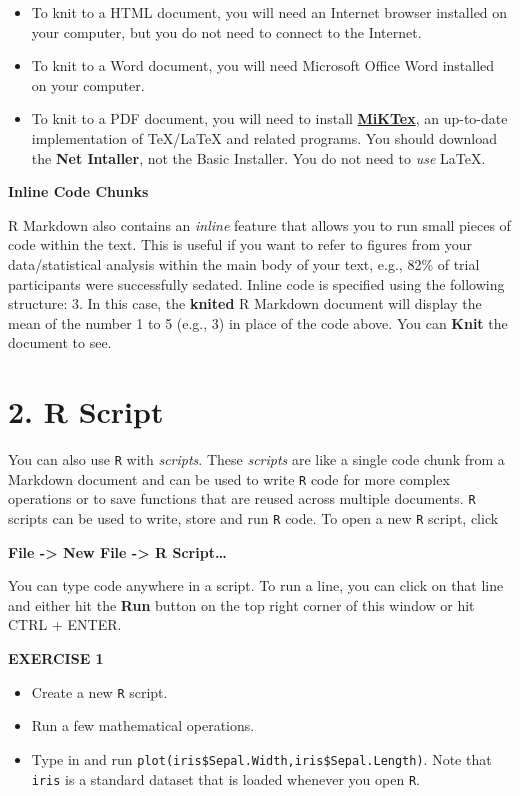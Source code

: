 \documentclass[
]{article}
\begin{document}
\begin{itemize}
\item
  To knit to a HTML document, you will need an Internet browser
  installed on your computer, but you do not need to connect to the
  Internet.
\item
  To knit to a Word document, you will need Microsoft Office Word
  installed on your computer.
\item
  To knit to a PDF document, you will need to install
  \href{https://miktex.org/download}{\textbf{MiKTex}}, an up-to-date
  implementation of TeX/LaTeX and related programs. You should download
  the \textbf{Net Intaller}, not the Basic Installer. You do not need to
  \emph{use} LaTeX.
\end{itemize}

\textbf{Inline Code Chunks}

R Markdown also contains an \emph{inline} feature that allows you to run
small pieces of code within the text. This is useful if you want to
refer to figures from your data/statistical analysis within the main
body of your text, e.g., 82\% of trial participants were successfully
sedated. Inline code is specified using the following structure: 3. In
this case, the \textbf{knited} R Markdown document will display the mean
of the number 1 to 5 (e.g., 3) in place of the code above. You can
\textbf{Knit} the document to see.

\hypertarget{r-script}{%
\section{2. R Script}\label{r-script}}

You can also use \texttt{R} with \emph{scripts}. These \emph{scripts}
are like a single code chunk from a Markdown document and can be used to
write \texttt{R} code for more complex operations or to save functions
that are reused across multiple documents. \texttt{R} scripts can be
used to write, store and run \texttt{R} code. To open a new \texttt{R}
script, click

\textbf{File -\textgreater{} New File -\textgreater{} R Script\ldots{}}

You can type code anywhere in a script. To run a line, you can click on
that line and either hit the \textbf{Run} button on the top right corner
of this window or hit CTRL + ENTER.

\textbf{EXERCISE 1}

\begin{itemize}
\item
  Create a new \texttt{R} script.
\item
  Run a few mathematical operations.
\item
  Type in and run \texttt{plot(iris\$Sepal.Width,iris\$Sepal.Length)}.
  Note that \texttt{iris} is a standard dataset that is loaded whenever
  you open \texttt{R}.
\end{itemize}
\end{document}
